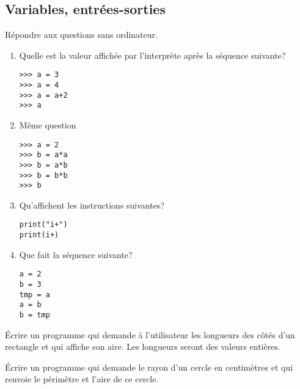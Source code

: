 \documentclass[a4paper,11pt]{article}
\begin{document}
\begin{Form}
\section{Variables, entrées-sorties}
\begin{exo}
Répondre aux questions sans ordinateur.
\begin{enumerate}
\item Quelle est la valeur affichée par l'interprète après la séquence suivante?
\begin{lstlisting}
>>> a = 3
>>> a = 4
>>> a = a+2
>>> a
\end{lstlisting}
\item Même question
\begin{lstlisting}
>>> a = 2
>>> b = a*a
>>> b = a*b
>>> b = b*b
>>> b
\end{lstlisting}
\item Qu'affichent les instructions suivantes?
\begin{lstlisting}
print("i+")
print(i+)
\end{lstlisting}
\item Que fait la séquence suivante?
\begin{lstlisting}
a = 2
b = 3
tmp = a
a = b
b = tmp
\end{lstlisting}
\end{enumerate}
\end{exo}
\begin{exo}
Écrire un programme qui demande à l'utilisateur les longueurs des côtés d'un rectangle et qui affiche son aire. Les longueurs seront des valeurs entières.
\end{exo}
\begin{exo}
Écrire un programme qui demande le rayon d'un cercle en centimètres et qui renvoie le périmètre et l'aire de ce cercle.
\end{exo}

\end{Form}
\end{document}
